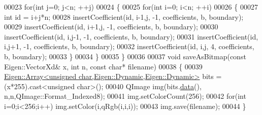 \begin{DoxyCode}
00023   \textcolor{keywordflow}{for}(\textcolor{keywordtype}{int} j=0; j<n; ++j)
00024   \{
00025     \textcolor{keywordflow}{for}(\textcolor{keywordtype}{int} i=0; i<n; ++i)
00026     \{
00027       \textcolor{keywordtype}{int} \textcolor{keywordtype}{id} = i+j*n;
00028       insertCoefficient(\textcolor{keywordtype}{id}, i-1,j, -1, coefficients, b, boundary);
00029       insertCoefficient(\textcolor{keywordtype}{id}, i+1,j, -1, coefficients, b, boundary);
00030       insertCoefficient(\textcolor{keywordtype}{id}, i,j-1, -1, coefficients, b, boundary);
00031       insertCoefficient(\textcolor{keywordtype}{id}, i,j+1, -1, coefficients, b, boundary);
00032       insertCoefficient(\textcolor{keywordtype}{id}, i,j,    4, coefficients, b, boundary);
00033     \}
00034   \}
00035 \}
00036 
00037 \textcolor{keywordtype}{void} saveAsBitmap(\textcolor{keyword}{const} Eigen::VectorXd& x, \textcolor{keywordtype}{int} n, \textcolor{keyword}{const} \textcolor{keywordtype}{char}* filename)
00038 \{
00039   \hyperlink{group___core___module_class_eigen_1_1_array}{Eigen::Array<unsigned char,Eigen::Dynamic,Eigen::Dynamic>}
       bits = (x*255).cast<unsigned char>();
00040   QImage img(bits.\hyperlink{class_eigen_1_1_plain_object_base_ac25699535374b1854cf8494e44ad31b2}{data}(), n,n,QImage::Format\_Indexed8);
00041   img.setColorCount(256);
00042   \textcolor{keywordflow}{for}(\textcolor{keywordtype}{int} i=0;i<256;i++) img.setColor(i,qRgb(i,i,i));
00043   img.save(filename);
00044 \}
\end{DoxyCode}
